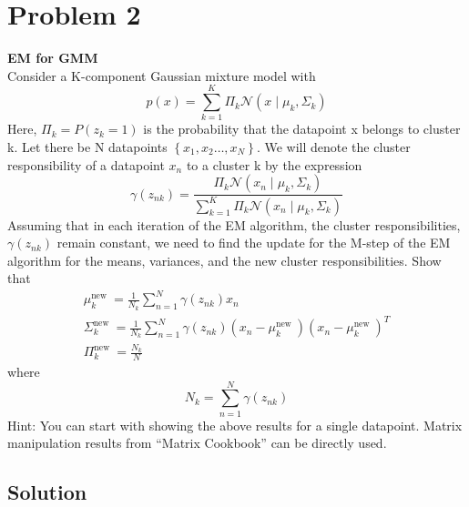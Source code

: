 \section*{Problem 2}

\textbf{EM for GMM}\\
Consider a K-component Gaussian mixture model with
\[
    p(x)=\sum_{k=1}^{K} \Pi_{k} \mathcal{N}\left(x \mid \mu_{k}, \Sigma_{k}\right)
\]
Here, \( \Pi_{k}=P\left(z_{k}=1\right) \) is the probability that the datapoint x belongs to cluster k.
Let there be N datapoints \( \left \{ x_{1}, x_{2} \ldots, x_{N}\right \} \).
We will denote the cluster responsibility of a datapoint \( x_{n} \) to a cluster k by the expression
\[
    \gamma\left(z_{n k}\right)=\frac{\Pi_{k} \mathcal{N}\left(x_{n} \mid \mu_{k}, \Sigma_{k}\right)}{\sum_{k=1}^{K} \Pi_{k} \mathcal{N}\left(x_{n} \mid \mu_{k}, \Sigma_{k}\right)}
\]
Assuming that in each iteration of the EM algorithm, the cluster responsibilities, \( \gamma\left(z_{n k}\right) \) remain constant, we need to find the update for the M-step of the EM algorithm for the means, variances, and the new cluster responsibilities.
Show that
\[
    \begin{gathered}
        \mu_{k}^{\text {new }}=\frac{1}{N_{k}} \sum_{n=1}^{N} \gamma\left(z_{n k}\right) x_{n} \\
        \Sigma_{k}^{\text {new }}=\frac{1}{N_{k}} \sum_{n=1}^{N} \gamma\left(z_{n k}\right)\left(x_{n}-\mu_{k}^{\text {new }}\right)\left(x_{n}-\mu_{k}^{\text {new }}\right)^{T} \\
        \Pi_{k}^{\text {new }}=\frac{N_{k}}{N}
    \end{gathered}
\]
where
\[
    N_{k}=\sum_{n=1}^{N} \gamma\left(z_{n k}\right)
\]
Hint: You can start with showing the above results for a single datapoint.
Matrix manipulation results from ``Matrix Cookbook'' can be directly used.

\subsection*{Solution}
